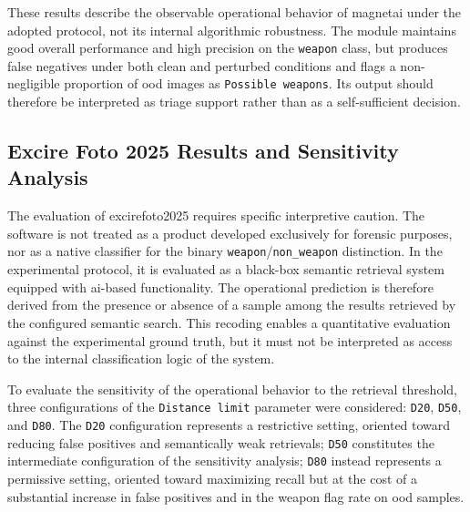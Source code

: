 These results describe the observable operational behavior of \gls{magnetai}
under the adopted protocol, not its internal algorithmic robustness. The module
maintains good overall performance and high precision on the \texttt{weapon}
class, but produces false negatives under both clean and perturbed conditions
and flags a non-negligible proportion of \gls{ood} images as
\texttt{Possible weapons}. Its output should therefore be interpreted as triage
support rather than as a self-sufficient decision.

\subsection{Excire Foto 2025 Results and Sensitivity Analysis}
\label{subsec:results-excire}

The evaluation of \gls{excirefoto2025} requires specific interpretive caution.
The software is not treated as a product developed exclusively for forensic
purposes, nor as a native classifier for the binary
\texttt{weapon}/\texttt{non\_weapon} distinction. In the experimental protocol,
it is evaluated as a black-box semantic retrieval system equipped with
\gls{ai}-based functionality. The operational prediction is therefore derived
from the presence or absence of a sample among the results retrieved by the
configured semantic search. This recoding enables a quantitative evaluation
against the experimental ground truth, but it must not be interpreted as access
to the internal classification logic of the system.

To evaluate the sensitivity of the operational behavior to the retrieval
threshold, three configurations of the \texttt{Distance limit} parameter were
considered: \texttt{D20}, \texttt{D50}, and \texttt{D80}. The \texttt{D20}
configuration represents a restrictive setting, oriented toward reducing false
positives and semantically weak retrievals; \texttt{D50} constitutes the
intermediate configuration of the sensitivity analysis; \texttt{D80} instead
represents a permissive setting, oriented toward maximizing recall but at the
cost of a substantial increase in false positives and in the weapon flag rate on
\gls{ood} samples.

